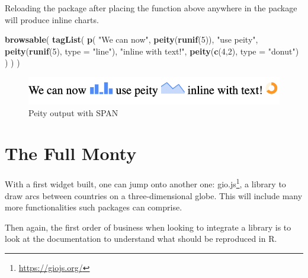 \documentclass[10pt,]{krantz}
\makeatletter
\newenvironment{Shaded}{\begin{snugshade}}{\end{snugshade}}
\newcommand{\DataTypeTok}[1]{\textcolor[rgb]{0.27,0.27,0.27}{#1}}
\newcommand{\DecValTok}[1]{\textcolor[rgb]{0.06,0.06,0.06}{#1}}
\newcommand{\KeywordTok}[1]{\textcolor[rgb]{0.27,0.27,0.27}{\textbf{#1}}}
\newcommand{\NormalTok}[1]{#1}
\newcommand{\StringTok}[1]{\textcolor[rgb]{0.5,0.5,0.5}{#1}}
\renewcommand{\href}[2]{#2\footnote{\url{#1}}}
\newenvironment{kframe}{%
\medskip{}
\setlength{\fboxsep}{.8em}
 \def\at@end@of@kframe{}%
 \ifinner\ifhmode%
  \def\at@end@of@kframe{\end{minipage}}%
  \begin{minipage}{\columnwidth}%
 \fi\fi%
 \def\FrameCommand##1{\hskip\@totalleftmargin \hskip-\fboxsep
 \colorbox{shadecolor}{##1}\hskip-\fboxsep
     \hskip-\linewidth \hskip-\@totalleftmargin \hskip\columnwidth}%
 \MakeFramed {\advance\hsize-\width
   \@totalleftmargin\z@ \linewidth\hsize
   \@setminipage}}%
 {\par\unskip\endMakeFramed%
 \at@end@of@kframe}
\renewenvironment{Shaded}{\begin{kframe}}{\end{kframe}}
\makeatother
\begin{document}
Reloading the package after placing the function above anywhere in the package will produce inline charts.

\begin{Shaded}
\begin{Highlighting}[]
\KeywordTok{browsable}\NormalTok{(}
  \KeywordTok{tagList}\NormalTok{(}
    \KeywordTok{p}\NormalTok{(}
      \StringTok{"We can now"}\NormalTok{, }\KeywordTok{peity}\NormalTok{(}\KeywordTok{runif}\NormalTok{(}\DecValTok{5}\NormalTok{)),}
      \StringTok{"use peity"}\NormalTok{, }\KeywordTok{peity}\NormalTok{(}\KeywordTok{runif}\NormalTok{(}\DecValTok{5}\NormalTok{), }\DataTypeTok{type =} \StringTok{"line"}\NormalTok{),}
      \StringTok{"inline with text!"}\NormalTok{,}
      \KeywordTok{peity}\NormalTok{(}\KeywordTok{c}\NormalTok{(}\DecValTok{4}\NormalTok{,}\DecValTok{2}\NormalTok{), }\DataTypeTok{type =} \StringTok{"donut"}\NormalTok{)}
\NormalTok{    )}
\NormalTok{  )}
\NormalTok{)}
\end{Highlighting}
\end{Shaded}

\begin{figure}[H]

{\centering \includegraphics[width=1\linewidth]{images/peity-span} 

}

\caption{Peity output with SPAN}\label{fig:peity-spans}
\end{figure}

\hypertarget{widgets-full}{%
\chapter{The Full Monty}\label{widgets-full}}

With a first widget built, one can jump onto another one: \href{https://giojs.org/}{gio.js}, a library to draw arcs between countries on a three-dimensional globe. This will include many more functionalities such packages can comprise.

Then again, the first order of business when looking to integrate a library is to look at the documentation to understand what should be reproduced in R.
\end{document}
